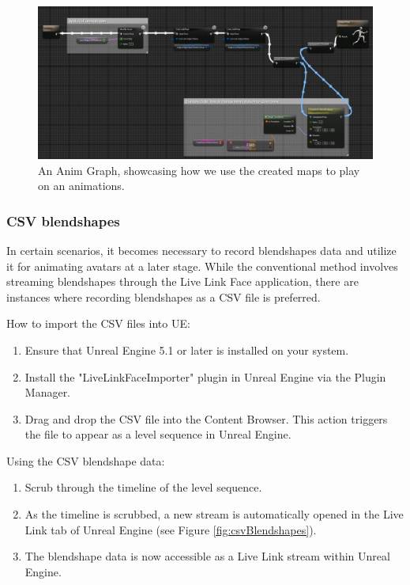 \documentclass{uva-inf-article}
\begin{document}
\begin{figure}[hbt!]
    \centering
    \includegraphics[width=1\textwidth]{imgs/ssAndLLFAnimGraph.png}
    \caption{An Anim Graph, showcasing how we use the created maps to play on an animations.}
    \label{fig:animgraphssLLF}
\end{figure}


\subsubsection{CSV blendshapes}
In certain scenarios, it becomes necessary to record blendshapes data and utilize it for animating avatars at a later stage. While the conventional method involves streaming blendshapes through the Live Link Face application, there are instances where recording blendshapes as a CSV file is preferred.

How to import the CSV files into UE:
\begin{enumerate}
    \item Ensure that Unreal Engine 5.1 or later is installed on your system.
    \item Install the "LiveLinkFaceImporter" plugin in Unreal Engine via the Plugin Manager.
    \item Drag and drop the CSV file into the Content Browser. This action triggers the file to appear as a level sequence in Unreal Engine.
\end{enumerate}

Using the CSV blendshape data:
\begin{enumerate}
    \item Scrub through the timeline of the level sequence.
    \item As the timeline is scrubbed, a new stream is automatically opened in the Live Link tab of Unreal Engine (see Figure \ref{fig:csvBlendshapes}).
    \item The blendshape data is now accessible as a Live Link stream within Unreal Engine.
\end{enumerate}
\end{document}
